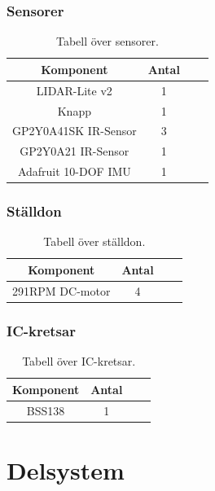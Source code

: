 \documentclass{article}
\begin{document}
\subsubsection{Sensorer}
\begin{table}[H]
  \centering
  \begin{tabular}{ | c | c | c | c |}
    \hline
    \textbf{Komponent} & \textbf{Antal} \\
    \hline
    LIDAR-Lite v2 & 1 \\
    \hline
    Knapp & 1 \\
    \hline
    GP2Y0A41SK IR-Sensor & 3 \\
    \hline
    GP2Y0A21 IR-Sensor & 1 \\
    \hline
    Adafruit 10-DOF IMU & 1 \\
    \hline
  \end{tabular}
  \caption{ Tabell över sensorer. }
\end{table}

\subsubsection{Ställdon}
\begin{table}[H]
  \centering
  \begin{tabular}{ | c | c | c | c |}
    \hline
    \textbf{Komponent} & \textbf{Antal} \\
    \hline
    291RPM DC-motor & 4 \\
    \hline
  \end{tabular}
  \caption{ Tabell över ställdon. }
\end{table}


\subsubsection{IC-kretsar}
\begin{table}[H]
  \centering
  \begin{tabular}{ | c | c | c | c |}
    \hline
    \textbf{Komponent} & \textbf{Antal} \\
    \hline
    BSS138 & 1 \\
    \hline
  \end{tabular}
  \caption{ Tabell över IC-kretsar. }
\end{table}

\clearpage
\section{Delsystem}
\end{document}
